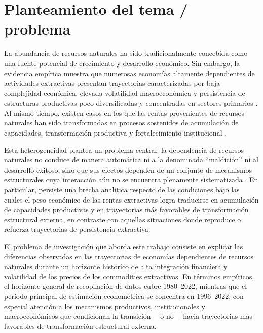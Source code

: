 \documentclass[../../PTFM.tex]{subfiles}
\begin{document}

	\chapter{Planteamiento del tema / problema}
	\label{chap:planteamiento}

	La abundancia de recursos naturales ha sido tradicionalmente concebida como una fuente potencial de crecimiento y desarrollo económico. Sin embargo, la evidencia empírica muestra que numerosas economías altamente dependientes de actividades extractivas presentan trayectorias caracterizadas por baja complejidad económica, elevada volatilidad macroeconómica y persistencia de estructuras productivas poco diversificadas y concentradas en sectores primarios \parencite{Tornell1999,Arezki2012}. Al mismo tiempo, existen casos en los que las rentas provenientes de recursos naturales han sido transformadas en procesos sostenidos de acumulación de capacidades, transformación productiva y fortalecimiento institucional \parencite{Ville2013}.

	Esta heterogeneidad plantea un problema central: la dependencia de recursos naturales no conduce de manera automática ni a la denominada ``maldición'' ni al desarrollo exitoso, sino que sus efectos dependen de un conjunto de mecanismos estructurales cuya interacción aún no se encuentra plenamente sistematizada \parencite{Lebdioui2019}. En particular, persiste una brecha analítica respecto de las condiciones bajo las cuales el peso económico de las rentas extractivas logra traducirse en acumulación de capacidades productivas y en trayectorias más favorables de transformación estructural externa, en contraste con aquellas situaciones donde reproduce o refuerza trayectorias de persistencia extractiva.

	El problema de investigación que aborda este trabajo consiste en explicar las diferencias observadas en las trayectorias de economías dependientes de recursos naturales durante un horizonte histórico de alta integración financiera y volatilidad de los precios de los commodities extractivos. En términos empíricos, el horizonte general de recopilación de datos cubre 1980--2022, mientras que el período principal de estimación econométrica se concentra en 1996--2022, con especial atención a los mecanismos productivos, institucionales y macroeconómicos que condicionan la transición ---o no--- hacia trayectorias más favorables de transformación estructural externa.
\end{document}
